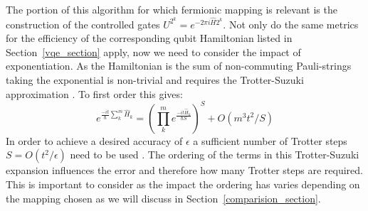 \documentclass[twoside]{article}
\begin{document}
The portion of this algorithm for which fermionic mapping is relevant is the construction of the controlled gates $U^{2^k} = e^{-2 \pi i \hat H 2^k}$. Not only do the same metrics for the efficiency of the corresponding qubit Hamiltonian listed in Section~\ref{vqe_section} apply, now we need to consider the impact of exponentiation. As the Hamiltonian is the sum of non-commuting Pauli-strings taking the exponential is non-trivial and requires the Trotter-Suzuki approximation \cite{suzuki}. To first order this gives:
\begin{equation}
        e^{\frac{-it}{\hbar} \sum^m_k \hat H_k} = \left( \prod^m_k e^{\frac{-i t \hat H_k}{\hbar S}}\right)^S + O(m^3 t^2/S)
\end{equation}
In order to achieve a desired accuracy of $\epsilon$ a sufficient number of Trotter steps $S= O(t^2/ \epsilon)$ need to be used \cite{chemistryReview}. The ordering of the terms in this Trotter-Suzuki expansion influences the error and therefore how many Trotter steps are required. This is important to consider as the impact the ordering has varies depending on the mapping chosen as we will discuss in Section~\ref{comparision_section}.\\\\
\end{document}
